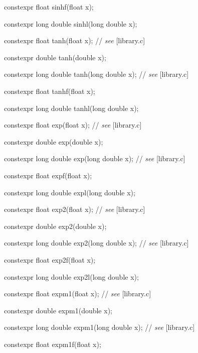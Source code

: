 \documentclass[prd,twocolumn,amsmath,amssymb,nofootinbib,eqsecnum]{revtex4-1}
\newcommand{\highlight}[1]{{\color{red} #1}}
\newcommand{\stdcomment}[1]{{// {\it see} [#1]}}
\begin{document}
{\highlight{constexpr} float sinhf(float x);

\highlight{constexpr} long double sinhl(long double x);

\vspace{2ex}


\highlight{constexpr} float tanh(float x); \stdcomment{library.c}

\highlight{constexpr} double tanh(double x);

\highlight{constexpr} long double tanh(long double x); \stdcomment{library.c}

\highlight{constexpr} float tanhf(float x);

\highlight{constexpr} long double tanhl(long double x);

\vspace{2ex}


\highlight{constexpr} float exp(float x); \stdcomment{library.c}

\highlight{constexpr} double exp(double x);

\highlight{constexpr} long double exp(long double x); \stdcomment{library.c}

\highlight{constexpr} float expf(float x);

\highlight{constexpr} long double expl(long double x);

\vspace{2ex}


\highlight{constexpr} float exp2(float x); \stdcomment{library.c}

\highlight{constexpr} double exp2(double x);

\highlight{constexpr} long double exp2(long double x); \stdcomment{library.c}

\highlight{constexpr} float exp2f(float x);

\highlight{constexpr} long double exp2l(long double x);

\vspace{2ex}


\highlight{constexpr} float expm1(float x); \stdcomment{library.c}

\highlight{constexpr} double expm1(double x);

\highlight{constexpr} long double expm1(long double x); \stdcomment{library.c}

\highlight{constexpr} float expm1f(float x);

}
\end{document}
